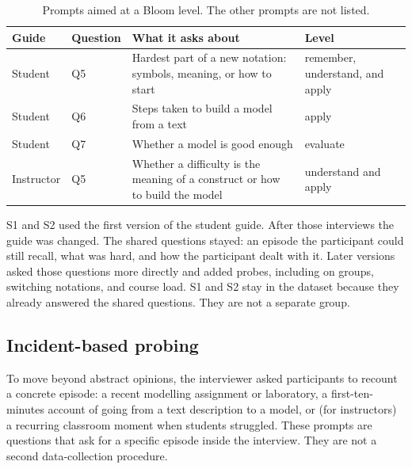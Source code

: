 \begin{table}[t]
\centering
\small
\caption{Prompts aimed at a Bloom level. The other prompts are not listed.}
\label{tab:bloom_prompts}
\begin{tabularx}{\textwidth}{l l X X}
\toprule
\textbf{Guide} & \textbf{Question} & \textbf{What it asks about} & \textbf{Level} \\
\midrule
Student & Q5 & Hardest part of a new notation: symbols, meaning, or how to start & remember, understand, and apply \\
Student & Q6 & Steps taken to build a model from a text & apply \\
Student & Q7 & Whether a model is good enough & evaluate \\
Instructor & Q5 & Whether a difficulty is the meaning of a construct or how to build the model & understand and apply \\
\bottomrule
\end{tabularx}
\end{table}

S1 and S2 used the first version of the student guide. After those interviews the guide was changed. The shared questions stayed: an episode the participant could still recall, what was hard, and how the participant dealt with it. Later versions asked those questions more directly and added probes, including on groups, switching notations, and course load. S1 and S2 stay in the dataset because they already answered the shared questions. They are not a separate group.

\subsection{Incident-based probing}
\label{subsec:method_modelling_task}

To move beyond abstract opinions, the interviewer asked participants to recount a concrete episode: a recent modelling assignment or laboratory, a first-ten-minutes account of going from a text description to a model, or (for instructors) a recurring classroom moment when students struggled. These prompts are questions that ask for a specific episode inside the interview. They are not a second data-collection procedure.

